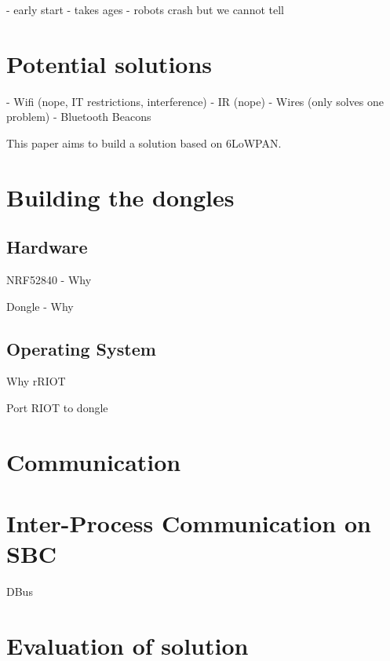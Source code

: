 \documentclass[conference]{IEEEtran}
\begin{document}
- early start
- takes ages
- robots crash but we cannot tell

\section{Potential solutions}

- Wifi (nope, IT restrictions, interference)
- IR (nope)
- Wires (only solves one problem)
- Bluetooth Beacons

This paper aims to build a solution based on 6LoWPAN.

\section{Building the dongles}

\subsection{Hardware}

NRF52840 - Why

Dongle - Why

\subsection{Operating System}

Why rRIOT

Port RIOT to dongle

\section{Communication}

\section{Inter-Process Communication on SBC}

DBus

\section{Evaluation of solution}




\end{document}
